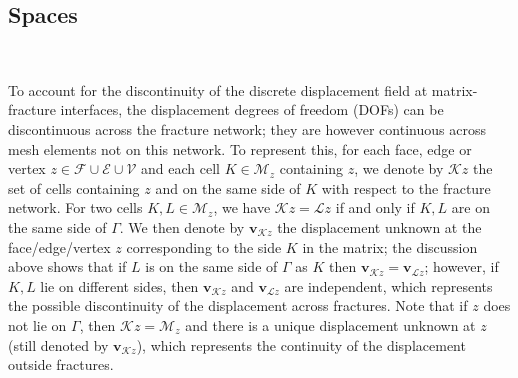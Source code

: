\documentclass[a4paper,11pt]{article}
\theoremstyle{definition}
\theoremstyle{remark}
\newcommand{\bo}[1]{\mathbf{#1}}
\def\cE{\mathcal{E}}
\def\cF{\mathcal{F}}
\def\cM{\mathcal{M}}
\def\cV{\mathcal{V}}
\newcommand{\Kz}{{\mathcal{K}z}}
\newcommand{\Lz}{{\mathcal{L}z}}
\begin{document}
\subsection{Spaces}\label{subsec_space}~

To account for the discontinuity of the discrete displacement field at matrix-fracture interfaces, the displacement degrees of freedom (DOFs) can be discontinuous across the fracture network; they are however continuous across mesh elements not on this network. To represent this, for each face, edge or vertex $z\in\cF\cup\cE\cup \cV$ and each cell $K\in\cM_z$ containing $z$, we denote by $\Kz$ the set of cells containing $z$ and on the same side of $K$ with respect to the fracture network. For two cells $K,L\in\cM_z$, we have $\Kz=\Lz$ if and only if $K,L$ are on the same side of $\Gamma$. We then denote by $\bo{v}_{\Kz}$ the displacement unknown at the face/edge/vertex $z$ corresponding to the side $K$ in the matrix; the discussion above shows that if $L$ is on the same side of $\Gamma$ as $K$ then $\bo{v}_{\Kz}=\bo{v}_{\Lz}$; however, if $K,L$ lie on different sides, then $\bo{v}_{\Kz}$ and $\bo{v}_{\Lz}$ are independent, which represents the possible discontinuity of the displacement across fractures. Note that if $z$ does not lie on $\Gamma$, then $\Kz=\cM_z$ and there is a unique displacement unknown at $z$ (still denoted by $\bo{v}_{\Kz}$), which represents the continuity of the displacement outside fractures.
\end{document}
